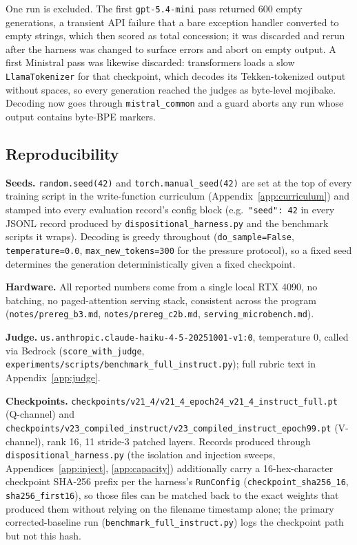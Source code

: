 One run is excluded. The first \texttt{gpt-5.4-mini} pass returned 600 empty generations, a
transient API failure that a bare exception handler converted to empty strings, which then
scored as total concession; it was discarded and rerun after the harness was changed to surface
errors and abort on empty output. A first Ministral pass was likewise discarded: transformers
loads a slow \texttt{LlamaTokenizer} for that checkpoint, which decodes its Tekken-tokenized
output without spaces, so every generation reached the judges as byte-level mojibake. Decoding
now goes through \texttt{mistral\_common} and a guard aborts any run whose output contains
byte-BPE markers.

\subsection{Reproducibility}
\label{app:repro}

\textbf{Seeds.} \texttt{random.seed(42)} and \texttt{torch.manual\_seed(42)} are set at
the top of every training script in the write-function curriculum
(Appendix~\ref{app:curriculum}) and stamped into every evaluation record's config block
(e.g.\ \texttt{"seed": 42} in every JSONL record produced by
\texttt{dispositional\_harness.py} and the benchmark scripts it wraps). Decoding is
greedy throughout (\texttt{do\_sample=False}, \texttt{temperature=0.0},
\texttt{max\_new\_tokens=300} for the pressure protocol), so a fixed seed determines the
generation deterministically given a fixed checkpoint.

\textbf{Hardware.} All reported numbers come from a single local RTX 4090, no batching,
no paged-attention serving stack, consistent across the program
(\texttt{notes/prereg\_b3.md}, \texttt{notes/prereg\_c2b.md},
\texttt{serving\_microbench.md}).

\textbf{Judge.} \texttt{us.anthropic.claude-haiku-4-5-20251001-v1:0}, temperature 0,
called via Bedrock (\texttt{score\_with\_judge},
\texttt{experiments/scripts/benchmark\_full\_instruct.py}); full rubric text in
Appendix~\ref{app:judge}.

\textbf{Checkpoints.} \texttt{checkpoints/v21\_4/v21\_4\_epoch24\_v21\_4\_instruct\_full.pt}
(Q-channel) and \texttt{checkpoints/v23\_compiled\_instruct/v23\_compiled\_instruct\_epoch99.pt}
(V-channel), rank 16, 11 stride-3 patched layers. Records produced through
\texttt{dispositional\_harness.py} (the isolation and injection sweeps,
Appendices~\ref{app:inject}, \ref{app:capacity}) additionally carry a 16-hex-character
checkpoint SHA-256 prefix per the harness's \texttt{RunConfig}
(\texttt{checkpoint\_sha256\_16}, \texttt{sha256\_first16}), so those files can be matched
back to the exact weights that produced them without relying on the filename timestamp
alone; the primary corrected-baseline run (\texttt{benchmark\_full\_instruct.py}) logs the
checkpoint path but not this hash.

